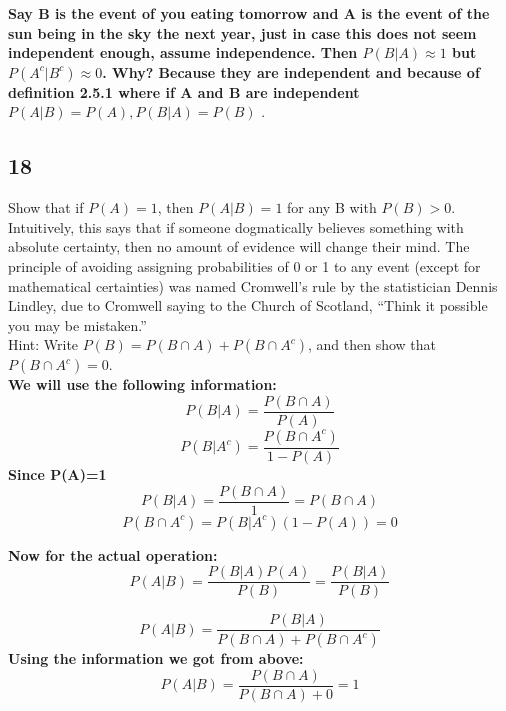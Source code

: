 \documentclass{article}
\begin{document}
\textbf{Say B is the event of you eating tomorrow and A is the event of the sun being in the sky the next year, just in case this does not seem independent enough, assume independence. Then $P(B|A)\approx 1$ but $P(A^c|B^c) \approx 0$. Why? Because they are independent and because of definition 2.5.1 where if A and B are independent $P(A|B)=P(A),P(B|A)=P(B)$ }.
\newpage
\subsection{18}
Show that if $P(A) = 1$, then $P(A|B) = 1$ for any B with $P(B) > 0$. Intuitively, this says that if someone dogmatically believes something with absolute certainty, then no amount of evidence will change their mind. The principle of avoiding assigning probabilities of 0 or 1 to any event (except for mathematical certainties) was named Cromwell’s rule by the statistician Dennis Lindley, due to Cromwell saying to the Church of Scotland, “Think it possible you may be mistaken.”\\
Hint: Write $P(B) = P(B \cap A) + P(B \cap A^c)$, and then show that $P(B \cap A^c) = 0$.\\
\textbf{We will use the following information:}
$$P(B | A)=\frac{P(B\cap A)}{P(A)}$$
$$P(B|A^c)=\frac{P(B \cap A^c)}{1-P(A)}$$
\textbf{Since P(A)=1}
$$P(B|A)=\frac{P(B \cap A)}{1}=P(B \cap A)$$
$$P(B \cap A^c)=P(B|A^c)(1-P(A))=0$$

\textbf{Now for the actual operation:}
$$P(A|B)=\frac{P(B|A)P(A)}{P(B)}=\frac{P(B|A)}{P(B)}$$

$$P(A|B)=\frac{P(B|A)}{P(B \cap A)+P(B \cap A^c)}$$
\textbf{Using the information we got from above:}
$$P(A|B)=\frac{P(B \cap A)}{P(B \cap A)+0}=1$$
\end{document}
